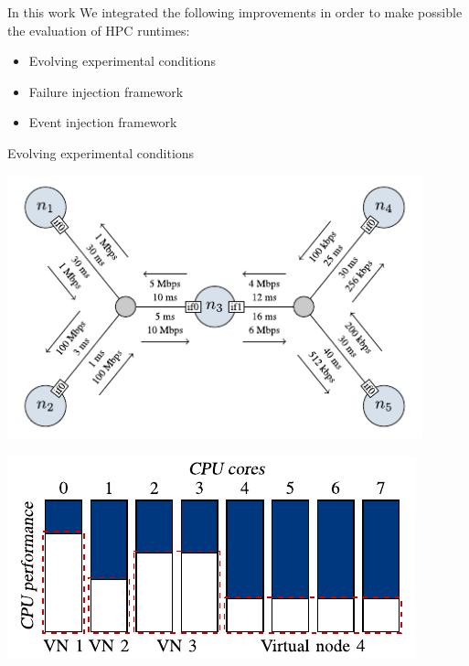\documentclass[11pt,xcolor=dvipsnames,presentation]{beamer}
\begin{document}
\begin{frame}[label=sec-2-0-3]{In this work}
We integrated the following improvements in order to
make possible the evaluation of HPC runtimes:

\begin{itemize}
\item Evolving experimental conditions
\item Failure injection framework
\item Event injection framework
\end{itemize}
\end{frame}

\begin{frame}[label=sec-2-0-4]{Evolving experimental conditions}

\begin{minipage}{0.5\textwidth}
\begin{center}
    \includegraphics[width=0.9\textwidth]{figures/links}
\end{center}\end{minipage}\hfill
\begin{minipage}{0.5\textwidth}
\begin{center}
    \includegraphics[width=\textwidth]{figures/procs}
\end{center}\end{minipage}


\end{frame}
\end{document}

